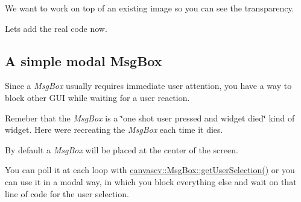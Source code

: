 We want to work on top of an existing image so you can see the transparency.

Let\textquotesingle{}s add the real code now.\hypertarget{tutmsgbox_msgbox_s2}{}\subsection{A simple modal Msg\+Box}\label{tutmsgbox_msgbox_s2}
Since a {\itshape Msg\+Box} usually requires immediate user attention, you have a way to block other G\+UI while waiting for a user reaction.

Remeber that the {\itshape Msg\+Box} is a \char`\"{}one shot user pressed and widget died\char`\"{} kind of widget. Here we\textquotesingle{}re recreating the {\itshape Msg\+Box} each time it dies.

By default a {\itshape Msg\+Box} will be placed at the center of the screen.

You can poll it at each loop with \hyperlink{classcanvascv_1_1MsgBox_a8762fe664f293389a1b823c75dc545e1}{canvascv\+::\+Msg\+Box\+::get\+User\+Selection()} or you can use it in a modal way, in which you block everything else and wait on that line of code for the user selection.

